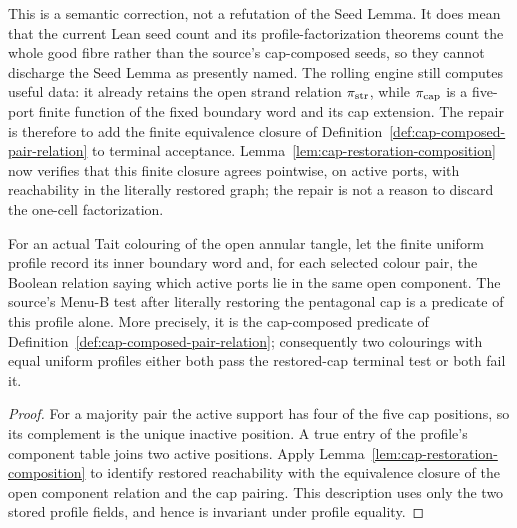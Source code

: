 This is a semantic correction, not a refutation of the Seed Lemma.  It does
mean that the current Lean seed count and its profile-factorization theorems
count the whole good fibre rather than the source's cap-composed seeds, so
they cannot discharge the Seed Lemma as presently named.  The rolling engine
still computes useful data: it already retains the open strand relation
$\pi_{\rm str}$, while $\pi_{\rm cap}$ is a five-port finite function of the
fixed boundary word and its cap extension.  The repair is therefore to add
the finite equivalence closure of
Definition~\ref{def:cap-composed-pair-relation} to terminal acceptance.
Lemma~\ref{lem:cap-restoration-composition} now verifies that this finite
closure agrees pointwise, on active ports, with reachability in the literally
restored graph; the repair is not a reason to discard the one-cell
factorization.

\begin{proposition}
\label{prop:cap-correct-terminal-profile}
For an actual Tait colouring of the open annular tangle, let the finite
uniform profile record its inner boundary word and, for each selected colour
pair, the Boolean relation saying which active ports lie in the same open
component.  The source's Menu-B test after literally restoring the pentagonal
cap is a predicate of this profile alone.  More precisely, it is the
cap-composed predicate of
Definition~\ref{def:cap-composed-pair-relation}; consequently two colourings
with equal uniform profiles either both pass the restored-cap terminal test or
both fail it.
\end{proposition}

\begin{proof}
For a majority pair the active support has four of the five cap positions, so
its complement is the unique inactive position.  A true entry of the profile's
component table joins two active positions.  Apply
Lemma~\ref{lem:cap-restoration-composition} to identify restored reachability
with the equivalence closure of the open component relation and the cap
pairing.  This description uses only the two stored profile fields, and hence
is invariant under profile equality.
\end{proof}

